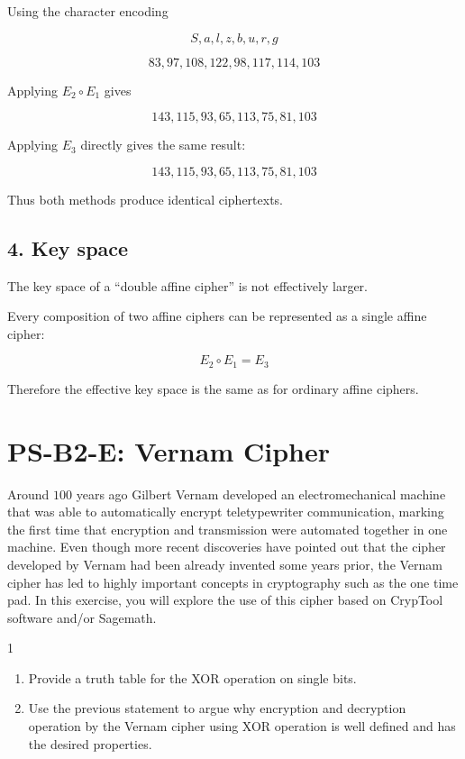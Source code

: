 \documentclass[]{scrartcl}
\newcounter{exercise}
\newcounter{qid}[section]
\newcommand{\exerciseprefix}{prefix}
\newcommand{\questiontitle}{Questions}
\newcommand{\blockid}{B2}
\newcommand{\exname}{}
\begin{document}
{Using the character encoding

\[
S,a,l,z,b,u,r,g
\]

\[
83,97,108,122,98,117,114,103
\]

Applying \(E_2\circ E_1\) gives

\[
143,115,93,65,113,75,81,103
\]

Applying \(E_3\) directly gives the same result:

\[
143,115,93,65,113,75,81,103
\]

Thus both methods produce identical ciphertexts.



\subsection*{4. Key space}

The key space of a ``double affine cipher'' is not effectively larger.

Every composition of two affine ciphers can be represented as a single affine cipher:

\[
E_2\circ E_1 = E_3
\]

Therefore the effective key space is the same as for ordinary affine ciphers.}







\newpage
{}
\pagebreak
\renewcommand{\exname}{Vernam Cipher}
\section*{PS-\blockid{}-E\theexercise: \exname{}}
Around $100$ years ago Gilbert Vernam developed an electromechanical machine that was able to automatically encrypt teletypewriter communication, marking the first time that encryption and transmission were automated together in one machine. Even though more recent discoveries have pointed out that the cipher developed by Vernam had been already invented some years prior, the Vernam cipher has led to highly important concepts in cryptography such as the one time pad. In this exercise, you will explore the use of this cipher based on CrypTool software and/or Sagemath.



\renewcommand{\exerciseprefix}{PS-\blockid{}-E\theexercise: \exname-Q\theqid}
\renewcommand{\questiontitle}{\exerciseprefix{}: Mathematical foundations for XOR}
\begin{exercisebox}{1}
\begin{enumerate}
    \item Provide a truth table for the XOR operation on single bits. 
    \item Use the previous statement to argue why encryption and decryption operation by the Vernam cipher using XOR operation is well defined and has the desired properties. 
\end{enumerate}

\end{exercisebox}
\end{document}
